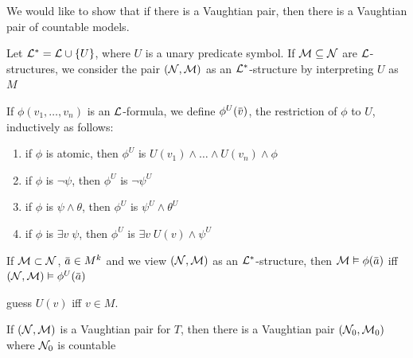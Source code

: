 \documentclass[11pt]{article}
\begin{document}
We would like to show that if there is a Vaughtian pair, then there is a Vaughtian pair of
countable models.

Let \(\mathcal{L}^*=\mathcal{L}\cup\{U\}\), where \(U\) is a unary predicate symbol. If \(\mathcal{M}\subseteq\mathcal{N}\) are \(\mathcal{L}\)-structures, we
consider the pair \((\mathcal{N},\mathcal{M})\) as an \(\mathcal{L}^*\)-structure by interpreting \(U\) as \(M\)

If \(\phi(v_1,\dots,v_n)\) is an \(\mathcal{L}\)-formula, we define \(\phi^U(\barv)\), the restriction of \(\phi\) to \(U\),
inductively as follows:
\begin{enumerate}
\item if \(\phi\) is atomic, then \(\phi^U\) is \(U(v_1)\wedge\dots\wedge U(v_n)\wedge\phi\)
\item if \(\phi\) is \(\neg\psi\), then \(\phi^U\) is \(\neg\psi^U\)
\item if \(\phi\) is \(\psi\wedge\theta\), then \(\phi^U\) is \(\psi^U\wedge\theta^U\)
\item if \(\phi\) is \(\exists v\;\psi\), then \(\phi^U\) is \(\exists v\;U(v)\wedge\psi^U\)
\end{enumerate}


If \(\mathcal{M}\subset\mathcal{N}\), \(\bara\in M^k\) and we view \((\mathcal{N},\mathcal{M})\) as an \(\mathcal{L}^*\)-structure, then \(\calm\vDash\phi(\bara)\)
iff \((\caln,\calm)\vDash\phi^U(\bara)\)

guess \(U(v)\) iff \(v\in M\).

\begin{lemma}[]
\label{lemma4.3.37}
If \((\mathcal{N},\mathcal{M})\) is a Vaughtian pair for \(T\), then there is a Vaughtian pair \((\mathcal{N}_0,\mathcal{M}_0)\)
where \(\mathcal{N}_0\) is countable
\end{lemma}
\end{document}

